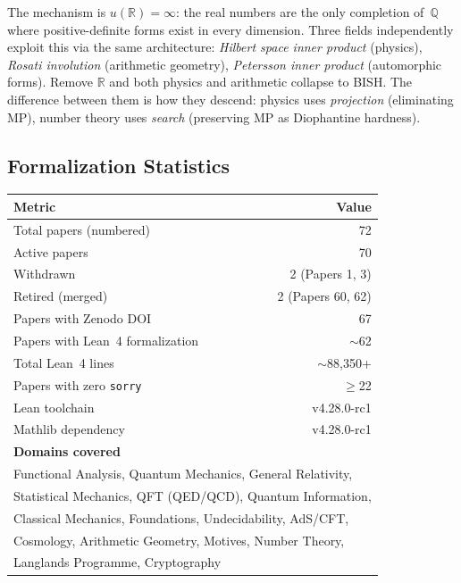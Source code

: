 \documentclass[11pt,a4paper]{article}
\begin{document}
\noindent The mechanism is $u(\mathbb{R}) = \infty$: the real numbers are the only completion of~$\mathbb{Q}$ where positive-definite forms exist in every dimension.  Three fields independently exploit this via the same architecture: \emph{Hilbert space inner product} (physics), \emph{Rosati involution} (arithmetic geometry), \emph{Petersson inner product} (automorphic forms).  Remove $\mathbb{R}$ and both physics and arithmetic collapse to BISH.  The difference between them is how they descend: physics uses \emph{projection} (eliminating MP), number theory uses \emph{search} (preserving MP as Diophantine hardness).

\subsection*{Formalization Statistics}

\begin{center}
\begin{tabular}{@{}lr@{}}
\toprule
\textbf{Metric} & \textbf{Value} \\
\midrule
Total papers (numbered) & 72 \\
Active papers & 70 \\
Withdrawn & 2 (Papers 1, 3) \\
Retired (merged) & 2 (Papers 60, 62) \\
Papers with Zenodo DOI & 67 \\
Papers with Lean~4 formalization & $\sim$62 \\
Total Lean~4 lines & $\sim$88,350+ \\
Papers with zero \texttt{sorry} & $\geq$22 \\
Lean toolchain & v4.28.0-rc1 \\
Mathlib dependency & v4.28.0-rc1 \\
\midrule
\textbf{Domains covered} & \\
\midrule
\multicolumn{2}{l}{Functional Analysis, Quantum Mechanics, General Relativity,} \\
\multicolumn{2}{l}{Statistical Mechanics, QFT (QED/QCD), Quantum Information,} \\
\multicolumn{2}{l}{Classical Mechanics, Foundations, Undecidability, AdS/CFT,} \\
\multicolumn{2}{l}{Cosmology, Arithmetic Geometry, Motives, Number Theory,} \\
\multicolumn{2}{l}{Langlands Programme, Cryptography} \\
\bottomrule
\end{tabular}
\end{center}
\end{document}
